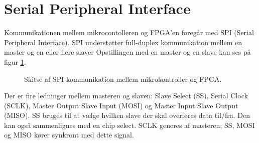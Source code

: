 \section{Serial Peripheral Interface}
Kommunikationen mellem mikrocontolleren og FPGA’en foregår med SPI (Serial Peripheral Interface). SPI understøtter full-duplex kommunikation mellem en master og en eller flere slaver
Opstillingen med en master og en slave kan ses på figur \ref{fig:SPImasterslave}.
\begin{figure}[!th]
\centering
\begin{tikzpicture}[scale=0.8]

\end{tikzpicture}
\caption[SPI protokol]{Skitse af SPI-kommunikation mellem mikrokontroller og FPGA.}
\label{fig:SPImasterslave}
\end{figure}

Der er fire ledninger mellem masteren og slaven: Slave Select (SS), Serial Clock (SCLK), Master Output Slave Input (MOSI) og Master Input Slave Output (MISO). SS bruges til at vælge hvilken slave der skal overføres data til/fra. Den kan også sammenlignes med en chip select. SCLK generes af masteren; SS, MOSI og MISO kører synkront med dette signal.